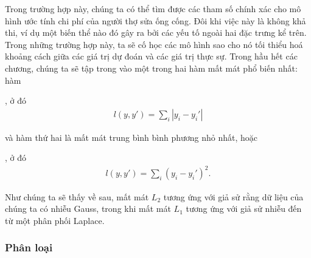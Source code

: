 \documentclass[letterpaper,11pt,english]{sphinxmanual}
\begin{document}
Trong trường hợp này, chúng ta có thể tìm được các tham số chính xác cho
mô hình ước tính chi phí của người thợ sửa ống cống. Đôi khi việc này là
không khả thi, ví dụ một biến thể nào đó gây ra bởi các yếu tố ngoài hai
đặc trưng kể trên. Trong những trường hợp này, ta sẽ cố học các mô hình
sao cho nó tối thiểu hoá khoảng cách giữa các giá trị dự đoán và các giá
trị thực sự. Trong hầu hết các chương, chúng ta sẽ tập trong vào một
trong hai hàm mất mát phổ biến nhất: hàm %
\begin{footnote}[30]\sphinxAtStartFootnote
{}
%
\end{footnote},
ở đó
\begin{equation}\label{equation:chapter_introduction/index_vn:chapter_introduction/index_vn:0}
\begin{split}l(y, y') = \sum_i |y_i-y_i'|\end{split}
\end{equation}


và hàm thứ hai là mất mát trung bình bình phương nhỏ nhất, hoặc %
\begin{footnote}[31]\sphinxAtStartFootnote
{}
%
\end{footnote},
ở đó
\begin{equation}\label{equation:chapter_introduction/index_vn:chapter_introduction/index_vn:1}
\begin{split}l(y, y') = \sum_i (y_i - y_i')^2.\end{split}
\end{equation}


Như chúng ta sẽ thấy về sau, mất mát \(L_2\) tương ứng với giả sử
rằng dữ liệu của chúng ta có nhiễu Gauss, trong khi mất mát \(L_1\)
tương ứng với giả sử nhiễu đến từ một phân phối Laplace.








\subsubsection{Phân loại}
\label{\detokenize{chapter_introduction/index_vn:phan-loai}}
\end{document}
